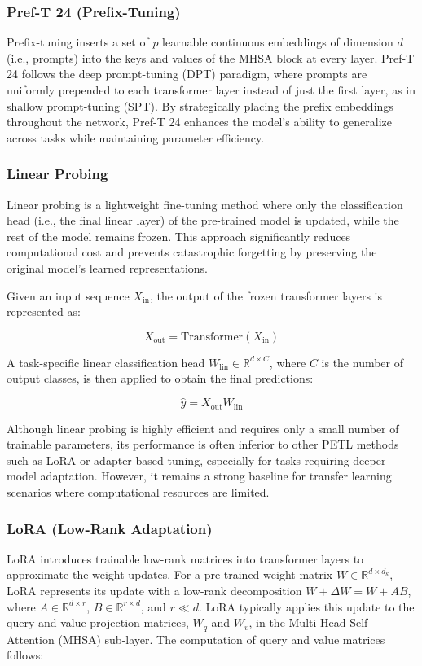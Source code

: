 \documentclass[11pt]{article}
\begin{document}
\subsubsection{Pref-T 24 (Prefix-Tuning)}
Prefix-tuning inserts a set of $p$ learnable continuous embeddings of dimension $d$ (i.e., prompts) into the keys and values of the MHSA block at every layer. Pref-T 24 follows the deep prompt-tuning (DPT) paradigm, where prompts are uniformly prepended to each transformer layer instead of just the first layer, as in shallow prompt-tuning (SPT). By strategically placing the prefix embeddings throughout the network, Pref-T 24 enhances the model’s ability to generalize across tasks while maintaining parameter efficiency.

\subsubsection{Linear Probing}
Linear probing is a lightweight fine-tuning method where only the classification head (i.e., the final linear layer) of the pre-trained model is updated, while the rest of the model remains frozen. This approach significantly reduces computational cost and prevents catastrophic forgetting by preserving the original model’s learned representations.

Given an input sequence $X_{\text{in}}$, the output of the frozen transformer layers is represented as:

\begin{equation}
X_{\text{out}} = \text{Transformer}(X_{\text{in}})
\end{equation}

A task-specific linear classification head $W_{\text{lin}} \in \mathbb{R}^{d \times C}$, where $C$ is the number of output classes, is then applied to obtain the final predictions:

\begin{equation}
\hat{y} = X_{\text{out}} W_{\text{lin}}
\end{equation}

Although linear probing is highly efficient and requires only a small number of trainable parameters, its performance is often inferior to other PETL methods such as LoRA or adapter-based tuning, especially for tasks requiring deeper model adaptation. However, it remains a strong baseline for transfer learning scenarios where computational resources are limited.

\subsubsection{LoRA (Low-Rank Adaptation)}
LoRA introduces trainable low-rank matrices into transformer layers to approximate the weight updates. For a pre-trained weight matrix $W \in \mathbb{R}^{d \times d_k}$, LoRA represents its update with a low-rank decomposition $W + \Delta W = W + AB$, where $A \in \mathbb{R}^{d \times r}$, $B \in \mathbb{R}^{r \times d}$, and $r \ll d$. LoRA typically applies this update to the query and value projection matrices, $W_q$ and $W_v$, in the Multi-Head Self-Attention (MHSA) sub-layer. The computation of query and value matrices follows:
\end{document}
